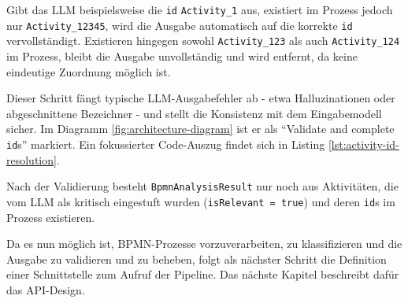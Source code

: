 Gibt das \ac{LLM} beispielsweise die \texttt{id} \texttt{Activity\_1} aus, existiert im Prozess jedoch nur \texttt{Activity\_12345}, wird die Ausgabe automatisch auf die korrekte \texttt{id} vervollständigt. Existieren hingegen sowohl \texttt{Activity\_123} als auch \texttt{Activity\_124} im Prozess, bleibt die Ausgabe unvollständig und wird entfernt, da keine eindeutige Zuordnung möglich ist.

Dieser Schritt fängt typische \ac{LLM}-Ausgabefehler ab - etwa Halluzinationen oder abgeschnittene Bezeichner - und stellt die Konsistenz mit dem Eingabemodell sicher. Im Diagramm \ref{fig:architecture-diagram} ist er als \enquote{Validate and complete \texttt{id}s} markiert. Ein fokussierter Code-Auszug findet sich in Listing \ref{lst:activity-id-resolution}.

Nach der Validierung besteht \texttt{BpmnAnalysisResult} nur noch aus Aktivitäten, die vom \ac{LLM} als kritisch eingestuft wurden (\texttt{isRelevant = true}) und deren \texttt{id}s im Prozess existieren.

Da es nun möglich ist, \ac{BPMN}-Prozesse vorzuverarbeiten, zu klassifizieren und die Ausgabe zu validieren und zu beheben, folgt als nächster Schritt die Definition einer Schnittstelle zum Aufruf der Pipeline. Das nächste Kapitel beschreibt dafür das API-Design.